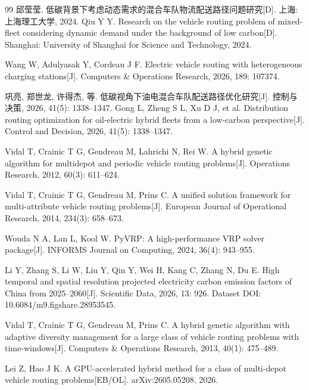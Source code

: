 \documentclass{setp-new}
\begin{document}
\begin{thebibliography}{99}
 邱莹莹. 低碳背景下考虑动态需求的混合车队物流配送路径问题研究[D]. 上海: 上海理工大学, 2024.\newline
Qiu Y Y. Research on the vehicle routing problem of mixed-fleet considering dynamic demand under the background of low carbon[D]. Shanghai: University of Shanghai for Science and Technology, 2024.


 Wang W, Adulyasak Y, Cordeau J F. Electric vehicle routing with heterogeneous charging stations[J]. Computers \& Operations Research, 2026, 189: 107374.

 巩亮, 郑世龙, 许得杰, 等. 低碳视角下油电混合车队配送路径优化研究[J]. 控制与决策, 2026, 41(5): 1338--1347.\newline
Gong L, Zheng S L, Xu D J, et al. Distribution routing optimization for oil-electric hybrid fleets from a low-carbon perspective[J]. Control and Decision, 2026, 41(5): 1338--1347.

 Vidal T, Crainic T G, Gendreau M, Lahrichi N, Rei W. A hybrid genetic algorithm for multidepot and periodic vehicle routing problems[J]. Operations Research, 2012, 60(3): 611--624.


 Vidal T, Crainic T G, Gendreau M, Prins C. A unified solution framework for multi-attribute vehicle routing problems[J]. European Journal of Operational Research, 2014, 234(3): 658--673.


 Wouda N A, Lan L, Kool W. PyVRP: A high-performance VRP solver package[J]. INFORMS Journal on Computing, 2024, 36(4): 943--955.


 Li Y, Zhang S, Li W, Liu Y, Qin Y, Wei H, Kang C, Zhang N, Du E. High temporal and spatial resolution projected electricity carbon emission factors of China from 2025--2060[J]. Scientific Data, 2026, 13: 926. Dataset DOI: 10.6084/m9.figshare.28953545.


 Vidal T, Crainic T G, Gendreau M, Prins C. A hybrid genetic algorithm with adaptive diversity management for a large class of vehicle routing problems with time-windows[J]. Computers \& Operations Research, 2013, 40(1): 475--489.


 Lei Z, Hao J K. A GPU-accelerated hybrid method for a class of multi-depot vehicle routing problems[EB/OL]. arXiv:2605.05208, 2026.


\end{thebibliography}
\end{document}

